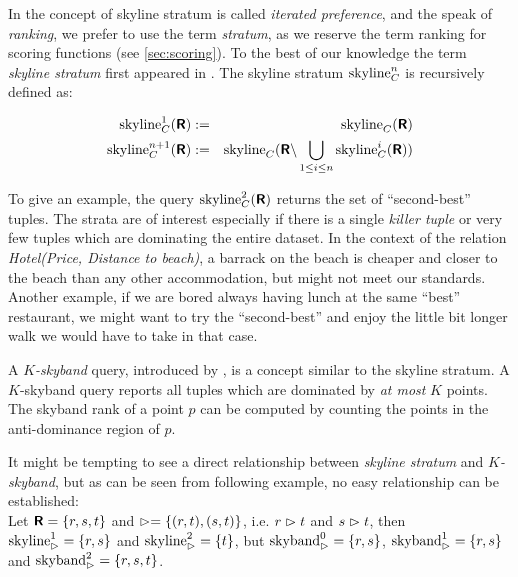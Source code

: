 In \citep{Chomicki2003a} the concept of skyline stratum is called
\emph{iterated preference}, and the speak of 
\emph{ranking}, we prefer to use the term
\emph{stratum}, as we reserve the term ranking for
scoring functions (see \autoref{sec:scoring}).
To the best of our knowledge the term \emph{skyline stratum} first 
appeared in \citep{Chan2005}.
The  skyline stratum $\skyline_C^n$ is recursively defined as:

\begin{eqnarray}
\skyline_C^1(\relation{R}) & := & \skyline_C(\relation{R}) \\
\skyline_C^{n+1}(\relation{R}) & := & \skyline_C(\relation{R} \difference \bigunion_{1 \le i \le n} \skyline_C^i(\relation{R}))
\end{eqnarray}

To give an example, the query $\skyline_C^2(\relation{R})$ returns
the set of ``second-best'' tuples.
%
The strata are of interest especially if there is a single
\emph{killer tuple} or very few tuples which are dominating the entire
dataset.  In the context of the relation \emph{Hotel(Price, Distance
to beach)}, a barrack on the beach is cheaper and closer to the beach
than any other accommodation, but might not meet our
standards.  Another example, if we are bored always having lunch at the
same ``best'' restaurant, we might want to try the ``second-best'' and
enjoy the little bit longer walk we would have to take in that case.

A \emph{$K$-skyband} query, introduced by
\citet{Papadias2005}, is a concept similar to the skyline stratum. A
$K$-skyband query reports all tuples which are dominated by \emph{at most}
$K$ points.  
The skyband rank of a point $p$ can be computed by counting the points
in the anti-dominance region of $p$.

It might be tempting to see a direct relationship between
\emph{skyline stratum} and \emph{$K$-skyband}, but as can be seen from
following example, no easy relationship can be established: \\
Let $\textnormal{\bf\textsf{R}} = \{r, s, t\}$ and $\vartriangleright =\{(r,t), (s,t)\}$, 
i.e. $r \vartriangleright t$ and $s \vartriangleright t$, 
then $\skyline_\dominates^1 = \{r, s\}$ and $\skyline_\dominates^2 = \{t\}$, 
but $\skyband_\dominates^0 = \{r, s\}$, $\skyband_\dominates^1 = \{r, s\}$ and
$\skyband_\dominates^2 = \{r, s, t\}$.

